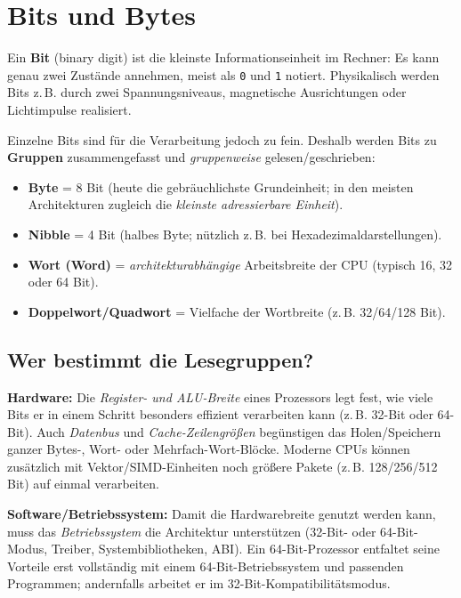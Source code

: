 \documentclass[../skript/main.tex]{subfiles}
\begin{document}
\section{Bits und Bytes}

Ein \textbf{Bit} (binary digit) ist die kleinste Informationseinheit im Rechner: Es kann genau zwei Zustände annehmen, meist als \texttt{0} und \texttt{1} notiert. Physikalisch werden Bits z.\,B. durch zwei Spannungsniveaus, magnetische Ausrichtungen oder Lichtimpulse realisiert.

Einzelne Bits sind für die Verarbeitung jedoch zu fein. Deshalb werden Bits zu \textbf{Gruppen} zusammengefasst und \emph{gruppenweise} gelesen/geschrieben:

\begin{itemize}
	\item \textbf{Byte} = 8 Bit (heute die gebräuchlichste Grundeinheit; in den meisten Architekturen zugleich die \emph{kleinste adressierbare Einheit}).
	\item \textbf{Nibble} = 4 Bit (halbes Byte; nützlich z.\,B. bei Hexadezimaldarstellungen).
	\item \textbf{Wort (Word)} = \emph{architekturabhängige} Arbeitsbreite der CPU (typisch 16, 32 oder 64 Bit).
	\item \textbf{Doppelwort/Quadwort} = Vielfache der Wortbreite (z.\,B. 32/64/128 Bit).
\end{itemize}

\subsection{Wer bestimmt die Lesegruppen?}
\textbf{Hardware:} Die \emph{Register- und ALU-Breite} eines Prozessors legt fest, wie viele Bits er in einem Schritt besonders effizient verarbeiten kann (z.\,B. 32-Bit oder 64-Bit). Auch \emph{Datenbus} und \emph{Cache-Zeilengrößen} begünstigen das Holen/Speichern ganzer Bytes-, Wort- oder Mehrfach-Wort-Blöcke. Moderne CPUs können zusätzlich mit Vektor\-/SIMD-Einheiten noch größere Pakete (z.\,B. 128/256/512 Bit) auf einmal verarbeiten.

\textbf{Software/Betriebssystem:} Damit die Hardwarebreite genutzt werden kann, muss das \emph{Betriebssystem} die Architektur unterstützen (32-Bit- oder 64-Bit-Modus, Treiber, Systembibliotheken, ABI). Ein 64-Bit-Prozessor entfaltet seine Vorteile erst vollständig mit einem 64-Bit-Betriebssystem und passenden Programmen; andernfalls arbeitet er im 32-Bit-Kompatibilitätsmodus.
\end{document}
